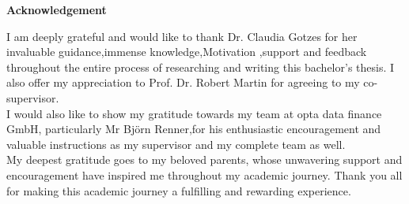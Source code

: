 \begin{center}
    \Large\textbf{Acknowledgement}
\end{center}
\normalsize
I am deeply grateful and would like to thank  Dr. Claudia Gotzes for her invaluable guidance,immense knowledge,Motivation ,support and feedback throughout the entire process of researching and writing this bachelor’s thesis.
I also offer my appreciation to Prof. Dr. Robert Martin  for agreeing to  my co-supervisor.\\
I would also like to show my gratitude towards my  team at opta data finance GmbH, particularly Mr Björn Renner,for his enthusiastic encouragement and valuable instructions as my supervisor and my complete team as well.\\
My deepest gratitude goes to my beloved parents, whose unwavering support and
encouragement have inspired me throughout my academic journey.
Thank you all for making this academic journey a fulfilling and rewarding experience.
